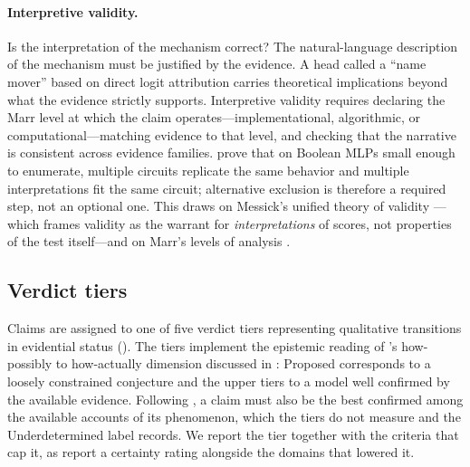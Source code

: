 \documentclass{article}
\begin{document}
\paragraph{Interpretive validity.} Is the interpretation of the mechanism correct? The natural-language description of the mechanism must be justified by the evidence. A head called a ``name mover'' based on direct logit attribution carries theoretical implications beyond what the evidence strictly supports. Interpretive validity requires declaring the Marr level at which the claim operates---implementational, algorithmic, or computational---matching evidence to that level, and checking that the narrative is consistent across evidence families. \citet{meloux2025everything} prove that on Boolean MLPs small enough to enumerate, multiple circuits replicate the same behavior and multiple interpretations fit the same circuit; alternative exclusion is therefore a required step, not an optional one. This draws on Messick's unified theory of validity \citep{messick1995validity}---which frames validity as the warrant for \emph{interpretations} of scores, not properties of the test itself---and on Marr's levels of analysis \citep{marr1982vision}.

\subsection{Verdict tiers}
\label{sec:verdict-tiers}

Claims are assigned to one of five verdict tiers representing qualitative transitions in evidential status (). The tiers implement the epistemic reading of \citeauthor{craver2006when}'s how-possibly to how-actually dimension discussed in : Proposed corresponds to a loosely constrained conjecture and the upper tiers to a model well confirmed by the available evidence. Following \citet{colombo2015models}, a claim must also be the best confirmed among the available accounts of its phenomenon, which the tiers do not measure and the Underdetermined label records. We report the tier together with the criteria that cap it, as \citet{guyatt2008grade} report a certainty rating alongside the domains that lowered it.
\end{document}
